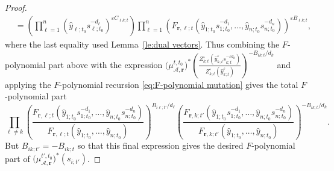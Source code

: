 \documentclass{amsart}
\numberwithin{equation}{section}
\newcommand{\bfr}{{\boldsymbol{r}}}
\newcommand{\cA}{\mathcal{A}}
\begin{document}
\begin{proof}
\begin{align*}
    &=\left(\prod_{\ell=1}^n (\hat y_{\ell;t_0} s_{\ell;t_0}^{-d_\ell})^{\varepsilon C_{\ell k;t}}\right) \prod_{\ell=1}^n \left(F_{\bfr,\ell;t}(\hat y_{1;t_0} s_{1;t_0}^{-d_1},\ldots,\hat y_{n;t_0} s_{n;t_0}^{-d_n})\right)^{\varepsilon B_{\ell k;t}},
  \end{align*}
  where the last equality used Lemma~\ref{le:dual vectors}.
  Thus combining the $F$-polynomial part above with the expression $\big(\mu_{\cA,\bfr}^{t,t_0}\big)^*\left(\frac{Z_{k;t}^\circ\left(\hat y_{k;t}^\varepsilon s_{k;t}^{-\varepsilon d_k}\right)}{Z_{k;t}^\circ(\hat y_{k;t}^\varepsilon)}\right)^{-B_{ik;t}/d_k}$ and applying the $F$-polynomial recursion \eqref{eq:F-polynomial mutation} gives the total $F$-polynomial part
  \[\prod_{\ell\ne k} \left(\frac{F_{\bfr,\ell;t}(\hat y_{1;t_0} s_{1;t_0}^{-d_1},\ldots,\hat y_{n;t_0} s_{n;t_0}^{-d_n})}{F_{\bfr,\ell;t}(\hat y_{1;t_0},\ldots,\hat y_{n;t_0})}\right)^{B_{i\ell;t'}/d_\ell} \left(\frac{F_{\bfr,k;t'}(\hat y_{1;t_0} s_{1;t_0}^{-d_1},\ldots,\hat y_{n;t_0} s_{n;t_0}^{-d_n})}{F_{\bfr,k;t'}(\hat y_{1;t_0},\ldots,\hat y_{n;t_0})}\right)^{-B_{ik;t}/d_k}.\]
  But $B_{ik;t'}=-B_{ik;t}$ so that this final expression gives the desired $F$-polynomial part of $\big(\mu_{\cA,\bfr}^{t',t_0}\big)^*(s_{i;t'})$.
\end{proof}
\end{document}
